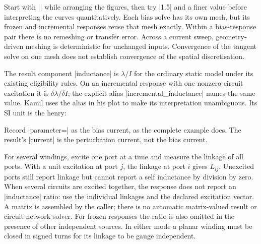 Start with || while arranging the figures, then try |1.5| and a finer
value before interpreting the curves quantitatively. Each bias solve has its
own mesh, but its frozen and incremental responses reuse that mesh exactly.
Within a bias-response pair there is no remeshing or transfer error. Across a
current sweep, geometry-driven meshing is deterministic for unchanged inputs.
Convergence of the tangent solve on one mesh does not establish convergence
of the spatial discretisation.


The result component |inductance| is $\lambda/I$ for the ordinary static
model under its existing eligibility rules. On an incremental response with
one nonzero circuit excitation it is $\delta\lambda/\delta I$; the explicit
alias |incremental_inductance| names the same value. Kamil uses the alias in
his plot to make its interpretation unambiguous. Its SI unit is the henry:
\begin{codeexample}
\femmresultplot[results={small-a,small-b,small-c},
  component=incremental_inductance,abscissa=parameter,
  plot options={orange!75!black,thick,mark=square*}]
\end{codeexample}
Record |parameter=| as the bias current, as the complete example does.
The result's |current| is the perturbation current, not the bias current.

For several windings, excite one port at a time and measure the linkage of
all ports. With a unit excitation at port $j$, the linkage at port $i$ gives
$L_{ij}$. Unexcited ports still report linkage but cannot report a self
inductance by division by zero. When several circuits are excited together,
the response does not report an |inductance| ratio: use the individual
linkages and the declared excitation vector. A matrix is assembled by the
caller; there is no automatic matrix-valued result or circuit-network solver.
For frozen responses the ratio is also omitted in the presence of other
independent sources. In either mode a planar winding must be closed in signed
turns for its linkage to be gauge independent.

